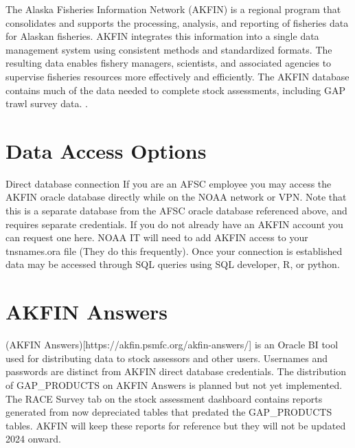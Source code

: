 \documentclass[
  letterpaper,
  oneside,
  open=any]{scrbook}
\begin{document}
The Alaska Fisheries Information Network (AKFIN) is a regional program
that consolidates and supports the processing, analysis, and reporting
of fisheries data for Alaskan fisheries. AKFIN integrates this
information into a single data management system using consistent
methods and standardized formats. The resulting data enables fishery
managers, scientists, and associated agencies to supervise fisheries
resources more effectively and efficiently. The AKFIN database contains
much of the data needed to complete stock assessments, including GAP
trawl survey data. .

\hypertarget{data-access-options}{%
\section*{Data Access Options}\label{data-access-options}}


Direct database connection If you are an AFSC employee you may access
the AKFIN oracle database directly while on the NOAA network or VPN.
Note that this is a separate database from the AFSC oracle database
referenced above, and requires separate credentials. If you do not
already have an AKFIN account you can request one here. NOAA IT will
need to add AKFIN access to your tnsnames.ora file (They do this
frequently). Once your connection is established data may be accessed
through SQL queries using SQL developer, R, or python.

\hypertarget{akfin-answers}{%
\section*{AKFIN Answers}\label{akfin-answers}}


(AKFIN Answers){[}https://akfin.psmfc.org/akfin-answers/{]} is an Oracle
BI tool used for distributing data to stock assessors and other users.
Usernames and passwords are distinct from AKFIN direct database
credentials. The distribution of GAP\_PRODUCTS on AKFIN Answers is
planned but not yet implemented. The RACE Survey tab on the stock
assessment dashboard contains reports generated from now depreciated
tables that predated the GAP\_PRODUCTS tables. AKFIN will keep these
reports for reference but they will not be updated 2024 onward.
\end{document}
